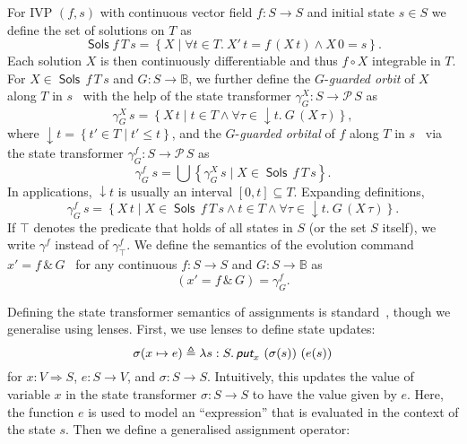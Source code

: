 \documentclass[envcountsame,envcountsect]{llncs}
\newcommand{\Pow}{\mathcal{P}}
\newcommand{\bools}{\mathbb{B}}
\newcommand{\Sols}{\mathop{\mathsf{Sols}}}
\newcommand{\defs}{\triangleq}
\newcommand{\lput}{\textit{\textsf{put}}}
\newcommand{\lto}{\Longrightarrow}
\begin{document}
For IVP $(f,s)$ with continuous vector field $f:S\to S$ and initial
state $s\in S$ we define the set of solutions on
$T$ as
\begin{equation*}
\Sols f\, T\, s = \left\{X \mid \forall t\in T.\  X'\, t = f\, (X\, t)\land X\, 0 = s\right\}.
\end{equation*}
Each solution $X$ is then continuously differentiable and thus
$f\circ X$ integrable in $T$.  For $X\in \Sols\, f\, T\, s$ and
$G:S\to\bools$, we further define the $G$-\emph{guarded orbit} of $X$
along $T$ in $s$~\cite{MuniveS19} with the help of the state transformer
$\gamma^X_G:S\to \Pow\, S$ as 
\begin{equation*}
\gamma^X_{G}\, s= \left\{X\, t\mid t\in T\land \forall \tau\in
{\downarrow}t.\ G\, (X\, \tau)\right\},
\end{equation*}
where ${\downarrow}t = \left\{t'\in T\mid t'\le t\right\}$, and the
$G$-\emph{guarded orbital} of $f$ along $T$ in $s$~\cite{MuniveS19}
via the state transformer $\gamma^f_G:S\to \Pow\, S$ as
\begin{equation*}
  \gamma^f_G\ s = \bigcup\left\{\gamma^X_G\, s\mid X\in \Sols\, f\, T\, s\right\}.
\end{equation*}
In applications, ${\downarrow}t$ is usually an interval
$[0,t]\subseteq T$.  Expanding definitions,
\begin{equation*}
\gamma^f_G\, s = \left\{X\, t \mid X\in \Sols\, f\, T\, s \land t\in T
\land \forall \tau\in{\downarrow}t.\ G\, (X\, \tau)\right\}.
\end{equation*}
If $\top$ denotes the predicate that holds of all states in $S$ (or
the set $S$ itself), we write $\gamma^f$ instead of
$\gamma^f_\top$. We define the semantics of the evolution command
$x'= f\, \&\, G$~\cite{MuniveS19} for any continuous $f:S\to S$ and
$G:S\to \bools$ as
\begin{equation}
{\left(x'= f\, \&\, G\right)} = \gamma^f_G.\label{eq:st-evl}\tag{st-evl}
\end{equation}

Defining the state transformer semantics of assignments is
standard~\cite{MuniveS19}, though we generalise using lenses. First,
we use lenses to define state updates:
$$\sigma(x\mapsto e) \defs \lambda s : S.\, \lput_x ~ (\sigma(s)) ~ (e(s))$$
for $x : V \lto S$, $e : S \to V$, and $\sigma : S \to
S$. Intuitively, this updates the value of variable $x$ in the state
transformer $\sigma : S \to S$ to have the value given by $e$. Here, the
function $e$ is used to model an ``expression'' that is evaluated in
the context of the state $s$. Then we define a generalised assignment operator:
\end{document}
